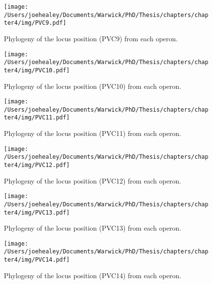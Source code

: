 \newpage
\begin{figure}[h!]
	\centering
	\texttt{[image: /Users/joehealey/Documents/Warwick/PhD/Thesis/chapters/chapter4/img/PVC9.pdf]}
	\captionsetup{singlelinecheck=off, justification=justified, font=footnotesize, aboveskip=19pt}
	\caption{Phylogeny of the locus position (PVC9) from each operon.}
	\label{pvc9tree}
\end{figure}
\hfill
\begin{figure}[h!]
	\centering
	\texttt{[image: /Users/joehealey/Documents/Warwick/PhD/Thesis/chapters/chapter4/img/PVC10.pdf]}
	\captionsetup{singlelinecheck=off, justification=justified, font=footnotesize, aboveskip=19pt}
	\caption{Phylogeny of the locus position (PVC10) from each operon.}
	\label{pvc10tree}
\end{figure}

\newpage
\begin{figure}[h!]
	\centering
	\texttt{[image: /Users/joehealey/Documents/Warwick/PhD/Thesis/chapters/chapter4/img/PVC11.pdf]}
	\captionsetup{singlelinecheck=off, justification=justified, font=footnotesize, aboveskip=19pt}
	\caption{Phylogeny of the locus position (PVC11) from each operon.}
	\label{pvc11tree}
\end{figure}
\hfill
\begin{figure}[h!]
	\centering
	\texttt{[image: /Users/joehealey/Documents/Warwick/PhD/Thesis/chapters/chapter4/img/PVC12.pdf]}
	\captionsetup{singlelinecheck=off, justification=justified, font=footnotesize, aboveskip=19pt}
	\caption{Phylogeny of the locus position (PVC12) from each operon.}
	\label{pvc12tree}
\end{figure}

\newpage
\begin{figure}[h!]
	\centering
	\texttt{[image: /Users/joehealey/Documents/Warwick/PhD/Thesis/chapters/chapter4/img/PVC13.pdf]}
	\captionsetup{singlelinecheck=off, justification=justified, font=footnotesize, aboveskip=19pt}
	\caption{Phylogeny of the locus position (PVC13) from each operon.}
	\label{pvc13tree}
\end{figure}
\hfill
\begin{figure}[h!]
	\centering
	\texttt{[image: /Users/joehealey/Documents/Warwick/PhD/Thesis/chapters/chapter4/img/PVC14.pdf]}
	\captionsetup{singlelinecheck=off, justification=justified, font=footnotesize, aboveskip=19pt}
	\caption{Phylogeny of the locus position (PVC14) from each operon.}
	\label{pvc14tree}
\end{figure}

